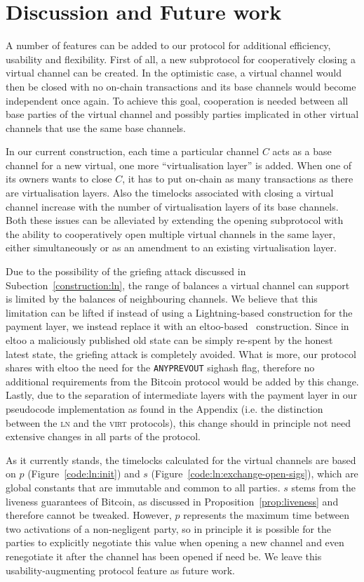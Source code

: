 \section{Discussion and Future work}
  A number of features can be added to our protocol for additional efficiency,
  usability and flexibility. First of all, a new subprotocol for cooperatively
  closing a virtual channel can be created. In the optimistic case, a virtual
  channel would then be closed with no on-chain transactions and its base
  channels would become independent once again. To achieve this goal,
  cooperation is needed between all base parties of the virtual channel and
  possibly parties implicated in other virtual channels that use the same base
  channels.

  In our current construction, each time a particular channel $C$ acts as a base
  channel for a new virtual, one more ``virtualisation layer'' is added. When
  one of its owners wants to close $C$, it has to put on-chain as many
  transactions as there are virtualisation layers. Also the timelocks associated
  with closing a virtual channel increase with the number of virtualisation
  layers of its base channels. Both these issues can be alleviated by extending
  the opening subprotocol with the ability to cooperatively open multiple
  virtual channels in the same layer, either simultaneously or as an amendment
  to an existing virtualisation layer.

  Due to the possibility of the griefing attack discussed in
  Subection~\ref{construction:ln}, the range of balances a virtual channel can
  support is limited by the balances of neighbouring channels. We believe that
  this limitation can be lifted if instead of using a Lightning-based
  construction for the payment layer, we instead replace it with an
  eltoo-based~\cite{eltoo} construction. Since in eltoo a maliciously published
  old state can be simply re-spent by the honest latest state, the griefing
  attack is completely avoided. What is more, our protocol shares with eltoo the
  need for the \texttt{ANYPREVOUT} sighash flag, therefore no additional
  requirements from the Bitcoin protocol would be added by this change. Lastly,
  due to the separation of intermediate layers with the payment layer in our
  pseudocode implementation as found in the Appendix (i.e. the distinction
  between the \textsc{ln} and the \textsc{virt} protocols), this change should
  in principle not need extensive changes in all parts of the protocol.

  As it currently stands, the timelocks calculated for the virtual channels are
  based on $p$ (Figure~\ref{code:ln:init}) and $s$
  (Figure~\ref{code:ln:exchange-open-sigs}),
  which are global constants that are immutable and common to all parties. $s$
  stems from the liveness guarantees of Bitcoin, as discussed in
  Proposition~\ref{prop:liveness} and therefore cannot be tweaked. However, $p$
  represents the maximum time between two activations of a non-negligent party,
  so in principle it is possible for the parties to explicitly negotiate this
  value when opening a new channel and even renegotiate it after the channel has
  been opened if need be. We leave this usability-augmenting protocol feature as
  future work.

